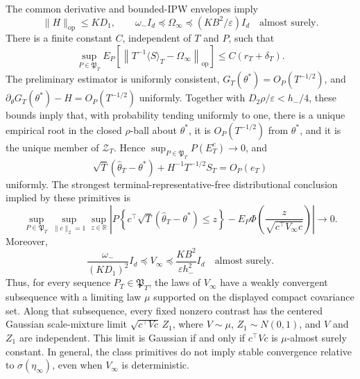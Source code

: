 The common derivative and bounded-IPW envelopes imply
\[
 \|H\|_{\mathrm{op}}\le KD_1,
 \qquad \omega_-I_d\preceq\Omega_\infty\preceq(KB^2/\varepsilon)I_d
 \quad\text{almost surely}.
\]
There is a finite constant \(C\), independent of \(T\) and \(P\), such that
\[
 \sup_{P\in\mathfrak P_T}E_P\!\left[\left\|T^{-1}\langle S\rangle_T-\Omega_\infty\right\|_{\mathrm{op}}\right]
 \le C(r_T+\delta_T).
\]
The preliminary estimator is uniformly consistent, \(G_T(\theta^*)=O_P(T^{-1/2})\), and \(\partial_\theta G_T(\theta^*)-H=O_P(T^{-1/2})\) uniformly. Together with \(D_2\rho/\varepsilon<h_-/4\), these bounds imply that, with probability tending uniformly to one, there is a unique empirical root in the closed \(\rho\)-ball about \(\theta^*\), it is \(O_P(T^{-1/2})\) from \(\theta^*\), and it is the unique member of \(\mathcal Z_T\). Hence \(\sup_{P\in\mathfrak P_T}P(E_T^c)\to0\), and
\[
 \sqrt T(\widehat\theta_T-\theta^*)+H^{-1}T^{-1/2}S_T=O_P(e_T)
\]
uniformly. The strongest terminal-representative-free distributional conclusion implied by these primitives is
\[
 \sup_{P\in\mathfrak P_T}\sup_{\|c\|_2=1}\sup_{z\in\mathbb R}
 \left|P\left\{c^\top\sqrt T(\widehat\theta_T-\theta^*)\le z\right\}
 -E_P\Phi\left(\frac{z}{\sqrt{c^\top V_\infty c}}\right)\right|\longrightarrow0.
\]
Moreover,
\[
 \frac{\omega_-}{(KD_1)^2}I_d\preceq V_\infty
 \preceq\frac{KB^2}{\varepsilon h_-^2}I_d\quad\text{almost surely}.
\]
Thus, for every sequence \(P_T\in\mathfrak P_T\), the laws of \(V_\infty\) have a weakly convergent subsequence with a limiting law \(\mu\) supported on the displayed compact covariance set. Along that subsequence, every fixed nonzero contrast has the centered Gaussian scale-mixture limit \(\sqrt{c^\top Vc}\,Z_1\), where \(V\sim\mu\), \(Z_1\sim N(0,1)\), and \(V\) and \(Z_1\) are independent. This limit is Gaussian if and only if \(c^\top Vc\) is \(\mu\)-almost surely constant. In general, the class primitives do not imply stable convergence relative to \(\sigma(\eta_\infty)\), even when \(V_\infty\) is deterministic.